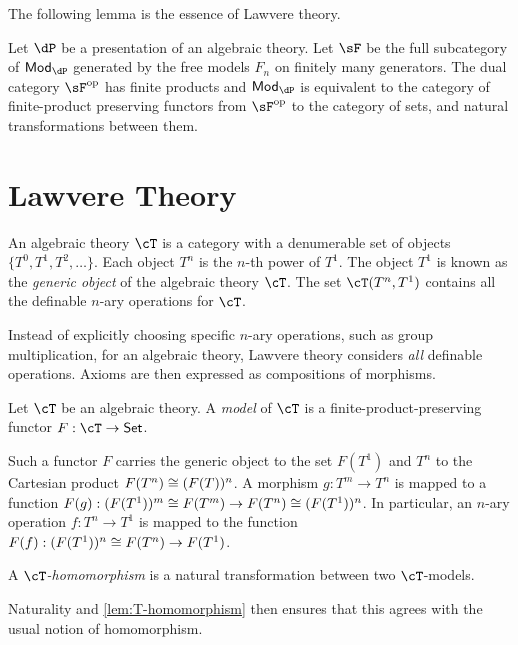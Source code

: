 \documentclass{amsart}
\begin{document}
The following lemma is the essence of Lawvere theory.
\begin{lem}
  Let $\dP$ be a presentation of an algebraic theory.
  Let $\sF$ be the full subcategory of $\mathsf{Mod}_{\dP}$ generated by the free models $F_{n}$ on finitely many generators.
  The dual category $\sF\op$ has finite products and $\mathsf{Mod}_{\dP}$ is equivalent to the category of finite-product preserving functors from $\sF\op$ to the category of sets,
  and natural transformations between them.
\end{lem}

\section{Lawvere Theory}
\label{sec:lawvere-theory}

\begin{defn}
  An algebraic theory $\cT$ is a category with a denumerable set of objects $\{T^{0}, T^{1}, T^{2}, \ldots\}$.
  Each object $T^{n}$ is the $n$-th power of $T^{1}$.
  The object $T^{1}$ is known as the \emph{generic object} of the algebraic theory $\cT$.
  The set $\cT(T^{n},T^{1})$ contains all the definable $n$-ary operations for $\cT$.
\end{defn}

Instead of explicitly choosing specific $n$-ary operations, such as group multiplication, for an algebraic theory, Lawvere theory considers \emph{all} definable operations.
Axioms are then expressed as compositions of morphisms.

\begin{defn}
  Let $\cT$ be an algebraic theory.
  A \emph{model} of $\cT$ is a finite-product-preserving functor $F : \cT \to \mathsf{Set}$.
\end{defn}

Such a functor $F$ carries the generic object to the set $F(T^{1})$ and $T^{n}$ to the Cartesian product $F(T^{n}) \cong (F(T))^{n}$.
A morphism $g : T^{m} \to T^{n}$ is mapped to a function $F(g) : (F(T^{1}))^{m} \cong F(T^{m}) \to F(T^{n}) \cong (F(T^{1}))^{n}$.
In particular, an $n$-ary operation $f : T^{n} \to T^{1}$ is mapped to the function $F(f) : (F(T^{1}))^{n} \cong F(T^{n}) \to F(T^{1})$.

\begin{defn}
  A \emph{$\cT$-homomorphism} is a natural transformation between two $\cT$-models.
\end{defn}

Naturality and \cref{lem:T-homomorphism} then ensures that this agrees with the usual notion of homomorphism.

\end{document}
